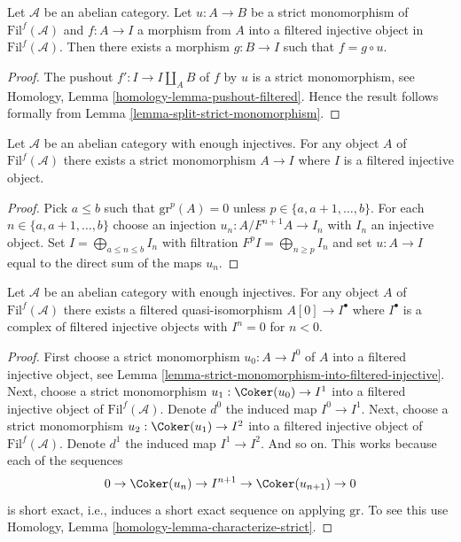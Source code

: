 \begin{lemma}
\label{lemma-injective-property-filtered-injective}
Let $\mathcal{A}$ be an abelian category.
Let $u : A \to B$ be a strict monomorphism
of $\text{Fil}^f(\mathcal{A})$
and $f : A \to I$ a morphism from $A$ into a filtered injective object
in $\text{Fil}^f(\mathcal{A})$.
Then there exists a morphism $g : B \to I$ such that $f = g \circ u$.
\end{lemma}

\begin{proof}
The pushout $f' : I \to I \amalg_A B$ of $f$ by $u$ is a strict
monomorphism, see
Homology, Lemma \ref{homology-lemma-pushout-filtered}.
Hence the result follows formally from
Lemma \ref{lemma-split-strict-monomorphism}.
\end{proof}

\begin{lemma}
\label{lemma-strict-monomorphism-into-filtered-injective}
Let $\mathcal{A}$ be an abelian category with enough injectives.
For any object $A$ of $\text{Fil}^f(\mathcal{A})$ there exists
a strict monomorphism $A \to I$
where $I$ is a filtered injective object.
\end{lemma}

\begin{proof}
Pick $a \leq b$ such that $\text{gr}^p(A) = 0$ unless
$p \in \{a, a + 1, \ldots, b\}$. For each
$n \in \{a, a + 1, \ldots, b\}$ choose an injection
$u_n : A/F^{n + 1}A \to I_n$ with $I_n$ an injective object.
Set $I = \bigoplus_{a \leq n \leq b} I_n$ with filtration
$F^pI = \bigoplus_{n \geq p} I_n$ and set $u : A \to I$ equal to
the direct sum of the maps $u_n$.
\end{proof}

\begin{lemma}
\label{lemma-filtered-injective-right-resolution-single-object}
Let $\mathcal{A}$ be an abelian category with enough injectives.
For any object $A$ of $\text{Fil}^f(\mathcal{A})$ there exists
a filtered quasi-isomorphism $A[0] \to I^\bullet$
where $I^\bullet$ is a complex of filtered injective objects
with $I^n = 0$ for $n < 0$.
\end{lemma}

\begin{proof}
First choose a strict monomorphism $u_0 : A \to I^0$ of $A$ into a filtered
injective object, see
Lemma \ref{lemma-strict-monomorphism-into-filtered-injective}.
Next, choose a strict monomorphism
$u_1 : \Coker(u_0) \to I^1$ into a filtered injective object of
$\text{Fil}^f(\mathcal{A})$. Denote $d^0$ the induced map $I^0 \to I^1$.
Next, choose a strict monomorphism $u_2 : \Coker(u_1) \to I^2$ into
a filtered injective object of $\text{Fil}^f(\mathcal{A})$. Denote $d^1$ the induced
map $I^1 \to I^2$. And so on. This works because each
of the sequences
$$
0 \to \Coker(u_n) \to I^{n + 1} \to \Coker(u_{n + 1}) \to 0
$$
is short exact, i.e., induces a short exact sequence on applying
$\text{gr}$. To see this use
Homology, Lemma \ref{homology-lemma-characterize-strict}.
\end{proof}

